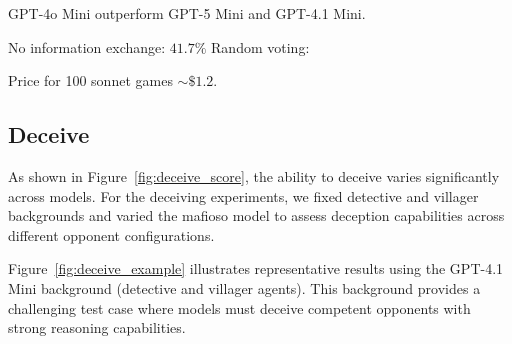 \documentclass{article}
\begin{document}
GPT-4o Mini outperform GPT-5 Mini and GPT-4.1 Mini.



No information exchange: $41.7\%$
Random voting: 

Price for 100 sonnet games $\sim \$1.2$.

\subsection{Deceive}

As shown in Figure~\ref{fig:deceive_score}, the ability to deceive varies significantly across models. For the deceiving experiments, we fixed detective and villager backgrounds and varied the mafioso model to assess deception capabilities across different opponent configurations.

Figure~\ref{fig:deceive_example} illustrates representative results using the GPT-4.1 Mini background (detective and villager agents). This background provides a challenging test case where models must deceive competent opponents with strong reasoning capabilities.
\end{document}
